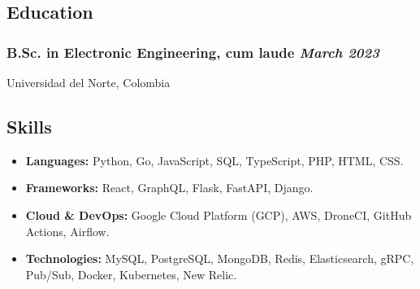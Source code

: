 \documentclass[a4paper,10pt]{article}
\begin{document}
\subsection*{Education}
\subsubsection*{\textbf{B.Sc. in Electronic Engineering, cum laude} \hfill \textit{March 2023}}
\noindent Universidad del Norte, Colombia

\subsection*{Skills}
\begin{itemize}
  \item \textbf{Languages:} Python, Go, JavaScript, SQL, TypeScript, PHP, HTML, CSS.
  \item \textbf{Frameworks:} React, GraphQL, Flask, FastAPI, Django.
  \item \textbf{Cloud \& DevOps:} Google Cloud Platform (GCP), AWS, DroneCI, GitHub Actions, Airflow.
  \item \textbf{Technologies:} MySQL, PostgreSQL, MongoDB, Redis, Elasticsearch, gRPC, Pub/Sub, Docker, Kubernetes, New Relic.
\end{itemize}

\end{document}

